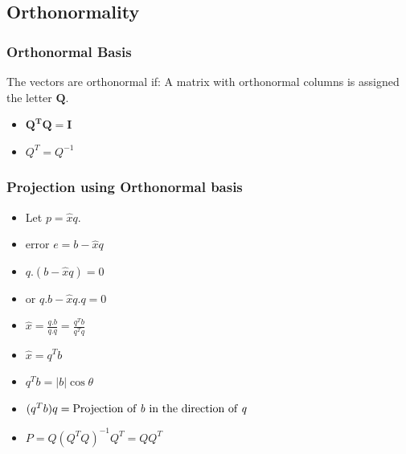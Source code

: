 \documentclass{beamer}
\newtheorem{Key points}{Key points}
\begin{document}
\subsection{Orthonormality}
 \begin{frame}
   \frametitle{Orthonormal Basis}

\begin{definition}
  The vectors are orthonormal if:
 A matrix with orthonormal columns is assigned the letter $\mathbf{Q}$.
\end{definition}
\begin{itemize}
\item<3-> $\mathbf{Q^TQ=I}$
\item<4-> $Q^T=Q^{-1}$
\end{itemize}
\end{frame}
 \begin{frame}
   \frametitle{Projection using Orthonormal basis}
   \begin{itemize}
    \item Let $p=\hat{x}q$.
    \item<2-> error $e=b-\hat{x}q$
    \item<3-> $q.(b-\hat{x}q)=0$
    \item<4-> or $q.b - \hat{x}q.q=0$
    \item<5-> $\hat{x}=\frac{q.b}{q.q}=\frac{q^Tb}{q^Tq}$
    \item<6-> $\hat{x}=q^Tb$
    \item<7-> $q^Tb= \lvert{}b\rvert\cos\theta$
    \item<8-> $(q^Tb)q= \text{Projection of \emph{b} in the direction of \emph{q}}$
\item<9-> $P=Q(Q^TQ)^{-1}Q^T = QQ^T$
   \end{itemize} 
\end{frame}
\end{document}
